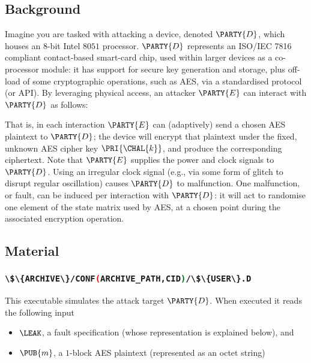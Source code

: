 \documentclass[crop={false},multi={true},tikz={true}]{standalone}
\begin{document}

\subsection{Background}

Imagine you are tasked with attacking a device, denoted $\PARTY{D}$, 
which houses an $8$-bit Intel $8051$ processor.
$\PARTY{D}$ represents an ISO/IEC 7816 compliant contact-based smart-card
chip, used within larger devices as a co-processor module: it has support
for secure key generation and storage, plus off-load of some cryptographic 
operations, such as AES, via a standardised protocol (or API).
By leveraging physical access, 
an attacker $\PARTY{E}$ can interact with $\PARTY{D}$ as follows:

\begin{center}

\end{center}

\noindent
That is, in each interaction $\PARTY{E}$ can (adaptively) send 
a chosen AES  plaintext
to $\PARTY{D}$; the device will
encrypt that  plaintext under the fixed, unknown AES cipher key $\PRI{\CHAL{k}}$,
and produce 
the corresponding ciphertext.
Note that $\PARTY{E}$ supplies the power and clock signals to $\PARTY{D}$.
Using an irregular clock signal (e.g., via some form of glitch to disrupt 
regular oscillation) causes $\PARTY{D}$ to malfunction.  One malfunction, 
or fault, can be induced per interaction with $\PARTY{D}$: it will act to 
randomise one element of the state matrix used by AES, at a chosen point 
during the associated encryption operation.

\subsection{Material}

\subsubsection{\lstinline[language={bash}]|\$\{ARCHIVE\}/CONF(ARCHIVE_PATH,CID)/\$\{USER\}.D|}

This executable simulates the attack target $\PARTY{D}$.  When executed it 
reads the following input

\begin{itemize}
\item $\LEAK$, 
      a  fault specification
      (whose representation is explained below),
      and
\item $\PUB{m}$,
      a  ${1}$-block AES plaintext
      (represented as an octet string)
\end{itemize}
\end{document}
